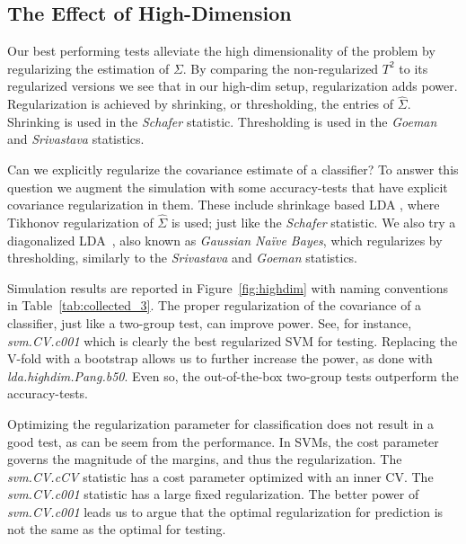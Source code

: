 \documentclass[]{bio}
\begin{document}
\subsection{The Effect of High-Dimension}
\label{sec:highdim}

Our best performing tests alleviate the high dimensionality of the problem by regularizing the estimation of $\Sigma$. 
By comparing the non-regularized $T^2$ to its regularized versions we see that in our high-dim setup, regularization adds power. 
Regularization is achieved by shrinking, or thresholding, the entries of $\hat{\Sigma}$.
Shrinking is used in the \emph{Schafer} statistic.
Thresholding is used in the \emph{Goeman} and \emph{Srivastava} statistics.

Can we explicitly regularize the covariance estimate of a classifier?
To answer this question we augment the simulation with some accuracy-tests that have explicit covariance regularization in them. 
These include shrinkage based LDA \citep{pang_shrinkage-based_2009,ramey_high-dimensional_2016}, where Tikhonov regularization of $\hat \Sigma$ is used; just like the \emph{Schafer} statistic.
We also try a diagonalized LDA~\citep{dudoit_comparison_2002}, also known as \emph{Gaussian Na\"ive Bayes}, which regularizes by thresholding, similarly to the \emph{Srivastava} and \emph{Goeman} statistics.

Simulation results are reported in Figure~\ref{fig:highdim} with naming conventions in Table~\ref{tab:collected_3}.
The proper regularization of the covariance of a classifier, just like a two-group test, can improve power. 
See, for instance, \emph{svm.CV.c001} which is clearly the best regularized SVM for testing. 
Replacing the V-fold  with a bootstrap allows us to further increase the power, as done with \emph{lda.highdim.Pang.b50}.
Even so, the out-of-the-box two-group tests outperform the accuracy-tests.

Optimizing the regularization parameter for classification does not result in a good test, as can be seem from the performance.
In SVMs, the cost parameter governs the magnitude of the margins, and thus the regularization. 
The  \emph{svm.CV.cCV} statistic has a cost parameter optimized with an inner CV. 
The \emph{svm.CV.c001} statistic has a large fixed regularization.
The better power of \emph{svm.CV.c001} leads us to argue that the optimal regularization for prediction is not the same as the optimal for testing.

\bigskip
\end{document}

